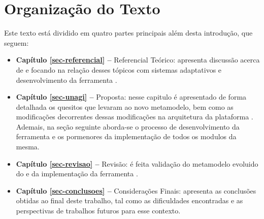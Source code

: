 \section{Organização do Texto}
\label{sec-intro-organizacao}

Este texto está dividido em quatro partes principais além desta introdução, que seguem:

\begin{itemize}
	\item \textbf{Capítulo \ref{sec-referencial} --} Referencial Teórico: apresenta discussão acerca de \gore e \mdd  focando na relação desses tópicos com sistemas adaptativos e desenvolvimento da ferramenta \unagi.
	
	\item \textbf{Capítulo \ref{sec-unagi} --} Proposta: nesse capitulo é apresentado de forma detalhada os quesitos que levaram ao novo metamodelo, bem como as modificações decorrentes dessas modificações na arquitetura da plataforma \zanshin. Ademais, na seção seguinte aborda-se o processo de desenvolvimento da ferramenta \unagi e os pormenores da implementação de todos os modulos da mesma.
	
	\item \textbf{Capítulo \ref{sec-revisao} --} Revisão: é feita validação do metamodelo evoluido do \zanshin e da implementação da ferramenta \unagi.
	
	\item \textbf{Capítulo \ref{sec-conclusoes} --} Considerações Finais: apresenta as conclusões obtidas ao final deste trabalho, tal como as dificuldades encontradas e as perspectivas de trabalhos futuros para esse contexto.
\end{itemize}









